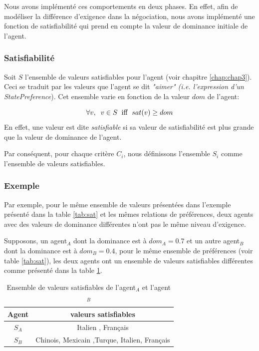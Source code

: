 	Nous avons implémenté ces comportements en deux phases. En effet, afin de modéliser la différence d'exigence dans la négociation, nous avons implémenté une fonction de satisfiabilité qui prend en compte la valeur de dominance initiale de l'agent. 
	
	\subsubsection{Satisfiabilité}
	
	Soit $S$ l'ensemble de valeurs satisfiables pour l'agent (voir chapitre \ref{chap:chap3}). Ceci se traduit par les valeurs que l'agent se dit \textit{"aimer" (i.e. l'expression d'un } \emph{StatePreference}). Cet ensemble varie en fonction de la valeur $dom$ de l'agent:
	
	\begin{equation}
	\forall v,\hspace{2mm} v\in S\hspace{2mm}\mathrm{iff}\hspace{2mm}sat(v) \geq dom
	\end{equation}
	En effet, une valeur est dite \textit{satisfiable} si sa valeur de satisfiabilité est plus grande que la valeur de dominance de l'agent.
	
	Par conséquent, pour chaque critère $C_i$, nous définissons l'ensemble $S_i$ comme l'ensemble de valeurs satisfiables. 
	
	\subsubsection{Exemple}
	
	Par exemple, pour le même ensemble de valeurs présentées dans l'exemple présenté dans la table \ref{tab:sat} et les mêmes relations de préférences, deux agents avec des valeurs de dominance différentes n'ont pas le même niveau d'exigence. 
	
	Supposons, un agent$_A$ dont la dominance est à $dom_A=0.7$ et un autre agent$_B$ dont la dominance est à $dom_B=0.4$, pour le même ensemble de préférences (voir table \ref{tab:sat}), les deux agents ont un ensemble de valeurs satisfiables différentes comme présenté dans la table \ref{tab:exSat}.

	\begin{table}[h]
		\centering
		{\scriptsize
			\begin{tabular}{ |c|c| }
				\hline
				\textbf{Agent} & \textbf{valeurs satisfiables} \\
				\hline				
				$S_A$ & Italien , Français \\
				\hline
				
				$S_B$ & Chinois,  Mexicain ,Turque, Italien, Français\\
				\hline
				
			\end{tabular}}
			\caption{Ensemble de valeurs satisfiables de l'agent$_A$ et l'agent $_B$}
			\label{tab:exSat}
		\end{table}


